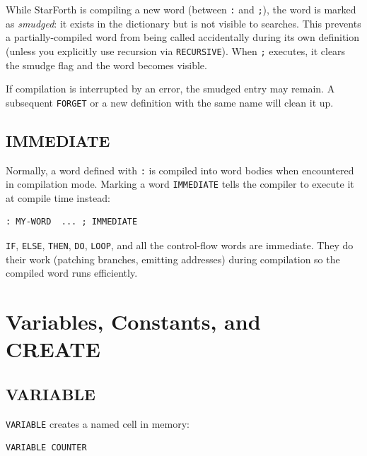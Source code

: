 While StarForth is compiling a new word (between \texttt{:} and \texttt{;}),
the word is marked as \emph{smudged}: it exists in the dictionary but is not
visible to searches. This prevents a partially-compiled word from being called
accidentally during its own definition (unless you explicitly use recursion via
\texttt{RECURSIVE}). When \texttt{;} executes, it clears the smudge flag and
the word becomes visible.

If compilation is interrupted by an error, the smudged entry may remain. A
subsequent \texttt{FORGET} or a new definition with the same name will clean it
up.

\section{IMMEDIATE}
\label{sec:immediate}

Normally, a word defined with \texttt{:} is compiled into word bodies when
encountered in compilation mode. Marking a word \texttt{IMMEDIATE} tells the
compiler to execute it at compile time instead:

\begin{lstlisting}[language=Forth]
: MY-WORD  ... ; IMMEDIATE
\end{lstlisting}

\texttt{IF}, \texttt{ELSE}, \texttt{THEN}, \texttt{DO}, \texttt{LOOP}, and
all the control-flow words are immediate. They do their work (patching
branches, emitting addresses) during compilation so the compiled word runs
efficiently.

\chapter{Variables, Constants, and CREATE}
\label{chap:variables}

\section{VARIABLE}
\label{sec:variable}

\texttt{VARIABLE} creates a named cell in memory:

\begin{lstlisting}[language=Forth]
VARIABLE COUNTER
\end{lstlisting}


